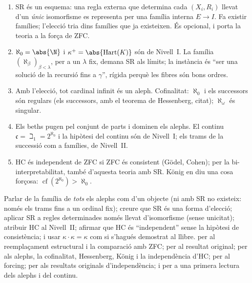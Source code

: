 \begin{resumcap}
\begin{enumerate}
  \item SR és un esquema: una regla externa que determina cada \((X_i,R_i)\) llevat d'un \emph{únic} isomorfisme es representa per una família interna \(E\to I\). Fa existir famílies; l'elecció tria dins famílies que ja existeixen. És opcional, i porta la teoria a la força de ZFC.
  \item \(\aleph_0=\abs{\N}\) i \(\kappa^{+}=\abs{\Hart(K)}\) són de Nivell~I. La família \((\aleph_\beta)_{\beta<\lambda}\), per a un \(\lambda\) fix, demana SR als límits; la instància és \enquote{ser una solució de la recursió fins a \(\gamma\)}, rígida perquè les fibres són bons ordres.
  \item Amb l'elecció, tot cardinal infinit és un aleph. Cofinalitat: \(\aleph_0\) i els successors són regulars (els successors, amb el teorema de Hessenberg, citat); \(\aleph_\omega\) és singular.
  \item Els beths pugen pel conjunt de parts i dominen els alephs. El continu \(\mathfrak c=\beth_1=2^{\aleph_0}\) i la hipòtesi del continu són de Nivell~I; els trams de la successió com a famílies, de Nivell~II.
  \item HC és independent de ZFC si ZFC és consistent (Gödel, Cohen); per la bi-interpretabilitat, també d'aquesta teoria amb SR. König en diu una cosa forçosa: \(\operatorname{cf}(2^{\aleph_0})>\aleph_0\).
\end{enumerate}
 Parlar de la família de \emph{tots} els alephs com d'un objecte (ni amb SR no existeix: només els trams fins a un ordinal fix); creure que SR és una forma d'elecció; aplicar SR a regles determinades només llevat d'isomorfisme (sense unicitat); atribuir HC al Nivell~II; afirmar que HC és \enquote{independent} sense la hipòtesi de consistència; i usar \(\kappa\cdot\kappa=\kappa\) com si s'hagués demostrat al llibre.
 \cite[§§2--4 i~7]{shulman-comparing} per al reemplaçament estructural i la comparació amb ZFC; \cite{osius1974} per al resultat original; \cite[cap.~3, 5 i~12--15]{jech2003} per als alephs, la cofinalitat, Hessenberg, König i la independència d'HC; \cite[cap.~I.10 i~VII]{kunen2011} per al forcing; \cite{godel1940,cohen1966} per als resultats originals d'independència; i \cite[§25]{halmos} per a una primera lectura dels alephs i del continu.
\end{resumcap}
